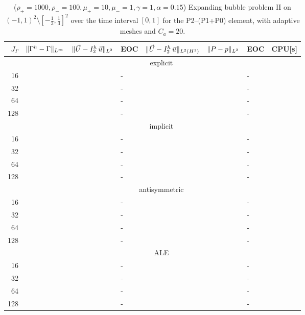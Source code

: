 \begin{table}
\center
\hspace*{-3.25cm}
\begin{tabular}{rllllllr}
\hline
$J_\Gamma$ & $\|\Gamma^h - \Gamma\|_{L^\infty}$ & $\|\vec U - I^h_{2}\,\vec u\|_{L^2}$ & EOC & $\|\vec U - I^h_{2}\,\vec u\|_{L^2(H^1)}$ & $\|P - p\|_{L^2}$ & EOC
& CPU[s] \\
\hline
& \multicolumn{7}{c}{explicit} \\
\hline
 16 & & & - & & & - & \\
 32 & & & - & & & - & \\
 64 & & & - & & & - & \\
128 & & & - & & & - & \\
\hline
& \multicolumn{7}{c}{implicit} \\
\hline
 16 & & & - & & & - & \\
 32 & & & - & & & - & \\
 64 & & & - & & & - & \\
128 & & & - & & & - & \\
\hline
& \multicolumn{7}{c}{antisymmetric} \\
\hline
 16 & & & - & & & - & \\
 32 & & & - & & & - & \\
 64 & & & - & & & - & \\
128 & & & - & & & - & \\
\hline
& \multicolumn{7}{c}{ALE} \\
\hline
 16 & & & - & & & - & \\
 32 & & & - & & & - & \\
 64 & & & - & & & - & \\
128 & & & - & & & - & \\
\hline
\end{tabular}
\hspace*{-3.25cm}
\caption[Navier--Stokes expanding bubble II errors P2--(P1+P0)]
{($\rho_+ = 1000,\rho_- = 100,\mu_+ = 10,\mu_- =1,\gamma = 1,\alpha=0.15$)
Expanding bubble problem II on $(-1,1)^2\setminus[-\frac{1}{3},\frac{1}{3}]^2$
over the time interval $[0,1]$ for the P2--(P1+P0) element, with adaptive
meshes and $C_a=20$\textdegree.}
\label{tab:nsexpandingbubbleIIp2p1p0}
\end{table}


